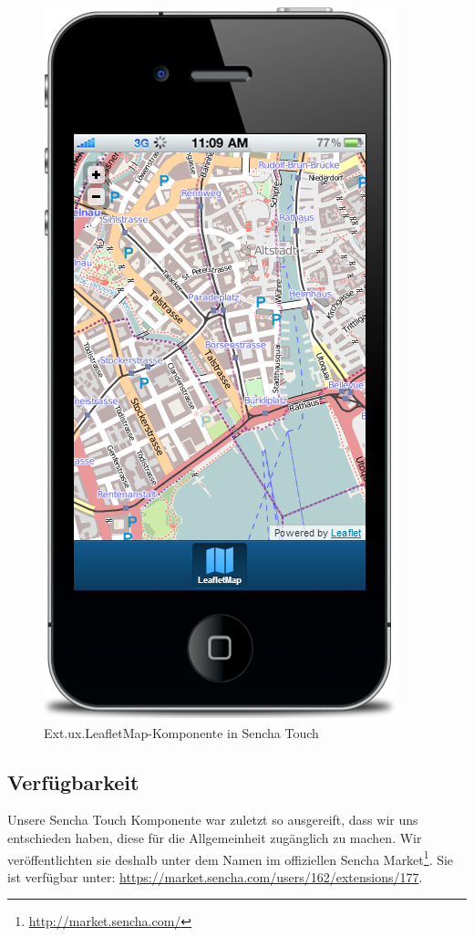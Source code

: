 \begin{figure}[H]
	\centering
	\includegraphics[scale=0.5]{images/implementation/frontend/leafletmap-screenshot}
	\caption{Ext.ux.LeafletMap-Komponente in Sencha Touch}
	\label{image-leafletmap-screenshot}
\end{figure}

\subsection{Verfügbarkeit}
Unsere Sencha Touch Komponente war zuletzt so ausgereift, dass wir uns entschieden haben, diese für die Allgemeinheit zugänglich zu machen.
Wir veröffentlichten sie deshalb unter dem Namen  im offiziellen Sencha Market\footnote{\url{http://market.sencha.com/}}.
Sie ist verfügbar unter: \url{https://market.sencha.com/users/162/extensions/177}.

